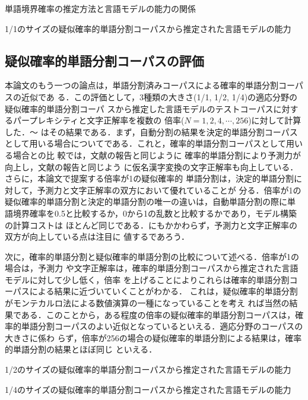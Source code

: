 \documentclass[japanese]{jnlp_1.4}
\begin{document}
\begin{table}[t]
  \caption{単語境界確率の推定方法と言語モデルの能力の関係}

  \label{table:result1}
\end{table}
\begin{table}[t]
  \caption{1/1のサイズの疑似確率的単語分割コーパスから推定された言語モデルの能力}

  \label{table:result2}
\end{table}



\subsection{疑似確率的単語分割コーパスの評価}

本論文のもう一つの論点は，単語分割済みコーパスによる確率的単語分割コーパスの近似であ
る．この評価として，3種類の大きさ(1/1, 1/2, 1/4)の適応分野の疑似確率的単語分割コーパ
スから推定した言語モデルのテストコーパスに対するパープレキシティと文字正解率を複数の
倍率($N = 1,2,4,\cdots, 256$)に対して計算した．〜
はその結果である．まず，自動分割の結果を決定的単語分割コーパス
として用いる場合についてである．これと，確率的単語分割コーパスとして用いる場合との比
較では，文献\cite{確率的単語分割コーパスからの単語N-gram確率の計算}の報告と同じように
確率的単語分割により予測力が向上し，文献\cite{無限語彙の仮名漢字変換}の報告と同じよう
に仮名漢字変換の文字正解率も向上している．さらに，本論文で提案する倍率が1の疑似確率的
単語分割は，決定的単語分割に対して，予測力と文字正解率の双方において優れていることが
分る．倍率が1の疑似確率的単語分割と決定的単語分割の唯一の違いは，自動単語分割の際に単
語境界確率を0.5と比較するか，0から1の乱数と比較するかであり，モデル構築の計算コストは
ほとんど同じである．にもかかわらず，予測力と文字正解率の双方が向上している点は注目に
値するであろう．

次に，確率的単語分割と疑似確率的単語分割の比較について述べる．倍率が1の場合は，予測力
や文字正解率は，確率的単語分割コーパスから推定された言語モデルに対して少し低く，倍率
を上げることによりこれらは確率的単語分割コーパスによる結果に近づいていくことがわかる．
これは，疑似確率的単語分割がモンテカルロ法による数値演算の一種になっていることを考え
れば当然の結果である．このことから，ある程度の倍率の疑似確率的単語分割コーパスは，確
率的単語分割コーパスのよい近似となっているといえる．適応分野のコーパスの大きさに係わ
らず，倍率が256の場合の疑似確率的単語分割による結果は，確率的単語分割の結果とほぼ同じ
といえる．

\begin{table}[t]
  \caption{1/2のサイズの疑似確率的単語分割コーパスから推定された言語モデルの能力}

  \label{table:result3}
\end{table}
\begin{table}[t]
  \caption{1/4のサイズの疑似確率的単語分割コーパスから推定された言語モデルの能力}

  \label{table:result4}
\end{table}
\end{document}
